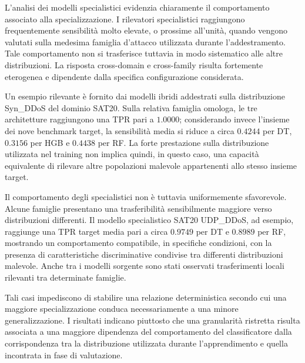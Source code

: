 L'analisi dei modelli specialistici evidenzia chiaramente il comportamento associato alla specializzazione.
I rilevatori specialistici raggiungono frequentemente sensibilità molto elevate, o prossime all'unità, quando vengono valutati sulla medesima famiglia d'attacco utilizzata durante l'addestramento.
Tale comportamento non si trasferisce tuttavia in modo sistematico alle altre distribuzioni.
La risposta cross-domain e cross-family risulta fortemente eterogenea e dipendente dalla specifica configurazione considerata.

Un esempio rilevante è fornito dai modelli ibridi addestrati sulla distribuzione Syn\_DDoS del dominio SAT20.
Sulla relativa famiglia omologa, le tre architetture raggiungono una TPR pari a $1.0000$; considerando invece l'insieme dei nove benchmark target, la sensibilità media si riduce a circa $0.4244$ per DT, $0.3156$ per HGB e $0.4438$ per RF.
La forte prestazione sulla distribuzione utilizzata nel training non implica quindi, in questo caso, una capacità equivalente di rilevare altre popolazioni malevole appartenenti allo stesso insieme target.

Il comportamento degli specialistici non è tuttavia uniformemente sfavorevole.
Alcune famiglie presentano una trasferibilità sensibilmente maggiore verso distribuzioni differenti.
Il modello specialistico SAT20 UDP\_DDoS, ad esempio, raggiunge una TPR target media pari a circa $0.9749$ per DT e $0.8989$ per RF, mostrando un comportamento compatibile, in specifiche condizioni, con la presenza di caratteristiche discriminative condivise tra differenti distribuzioni malevole.
Anche tra i modelli sorgente sono stati osservati trasferimenti locali rilevanti tra determinate famiglie.

Tali casi impediscono di stabilire una relazione deterministica secondo cui una maggiore specializzazione conduca necessariamente a una minore generalizzazione.
I risultati indicano piuttosto che una granularità ristretta risulta associata a una maggiore dipendenza del comportamento del classificatore dalla corrispondenza tra la distribuzione utilizzata durante l'apprendimento e quella incontrata in fase di valutazione.

